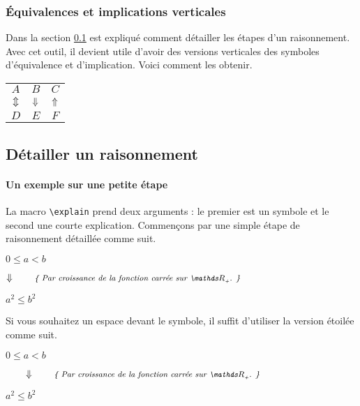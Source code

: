 \documentclass[12pt,a4paper]{article}
\theoremstyle{definition}
\begin{document}
\subsubsection{Équivalences et implications verticales}

Dans la section \ref{explain-proof} est expliqué comment détailler les étapes d'un raisonnement. Avec cet outil, il devient utile d'avoir des versions verticales des symboles d'équivalence et d'implication. Voici comment les obtenir.

\begin{tcblisting}{}
\begin{tabular}{ccc}
    $A$       &   $B$           &   $C$         \\
    $\viff$   &   $\vimplies$   &   $\vliesimp$ \\
    $D$       &   $E$           &   $F$
\end{tabular}
\end{tcblisting}





\subsection{Détailler un raisonnement} \label{explain-proof}

	\paragraph{Un exemple sur une petite étape}

La macro \verb+\explain+ prend deux arguments : le premier est un symbole et le second une courte explication. Commençons par une simple étape de raisonnement détaillée comme suit.

\begin{tcblisting}{}
$0 \leq a < b$

$\explain{\vimplies}{Par croissance de la fonction carrée sur $\RRp$.}$

$a^2 \leq b^2$
\end{tcblisting}

Si vous souhaitez un espace devant le symbole, il suffit d'utiliser la version étoilée comme suit.

\begin{tcblisting}{}
$0 \leq a < b$

$\explain*{\vimplies}{Par croissance de la fonction carrée sur $\RRp$.}$

$a^2 \leq b^2$
\end{tcblisting}
\end{document}
